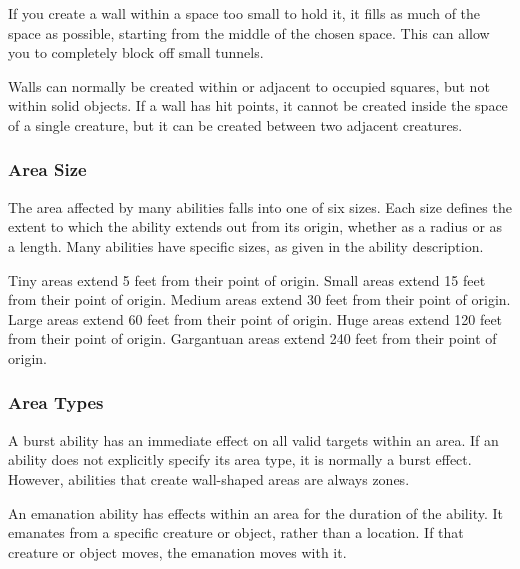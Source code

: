       If you create a wall within a space too small to hold it, it fills as much of the space as possible, starting from the middle of the chosen space.
      This can allow you to completely block off small tunnels.

      Walls can normally be created within or adjacent to occupied squares, but not within solid objects.
      If a wall has hit points, it cannot be created inside the space of a single creature, but it can be created between two adjacent creatures.


    \subsubsection{Area Size}

      The area affected by many abilities falls into one of six sizes.
      Each size defines the extent to which the ability extends out from its origin, whether as a radius or as a length.
      Many abilities have specific sizes, as given in the ability description.

       Tiny areas extend 5 feet from their point of origin.
       Small areas extend 15 feet from their point of origin.
       Medium areas extend 30 feet from their point of origin.
       Large areas extend 60 feet from their point of origin.
       Huge areas extend 120 feet from their point of origin.
       Gargantuan areas extend 240 feet from their point of origin.

    \subsubsection{Area Types}\label{Area Types}

       A burst ability has an immediate effect on all valid targets within an area.
      If an ability does not explicitly specify its area type, it is normally a burst effect.
      However, abilities that create wall-shaped areas are always zones.

       An emanation ability has effects within an area for the duration of the ability.
      It emanates from a specific creature or object, rather than a location.
      If that creature or object moves, the emanation moves with it.


